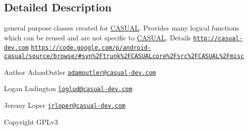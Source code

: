 \subsection{Detailed Description}
general purpose classes created for \hyperlink{namespace_c_a_s_u_a_l}{C\-A\-S\-U\-A\-L}. Provides many logical functions which can be reused and are not specific to \hyperlink{namespace_c_a_s_u_a_l}{C\-A\-S\-U\-A\-L}. Details \href{http://casual-dev.com}{\tt http\-://casual-\/dev.\-com} \href{https://code.google.com/p/android-casual/source/browse/#svn%2Ftrunk%2FCASUALcore%2Fsrc%2FCASUAL%2Fmisc}{\tt https\-://code.\-google.\-com/p/android-\/casual/source/browse/\#svn\%2\-Ftrunk\%2\-F\-C\-A\-S\-U\-A\-Lcore\%2\-Fsrc\%2\-F\-C\-A\-S\-U\-A\-L\%2\-Fmisc} \begin{DoxyAuthor}{Author}
Adam\-Outler \href{mailto:adamoutler@casual-dev.com}{\tt adamoutler@casual-\/dev.\-com} 

Logan Ludington \href{mailto:loglud@casual-dev.com}{\tt loglud@casual-\/dev.\-com} 

Jeremy Loper \href{mailto:jrloper@casual-dev.com}{\tt jrloper@casual-\/dev.\-com} 
\end{DoxyAuthor}
\begin{DoxyCopyright}{Copyright}
G\-P\-Lv3 
\end{DoxyCopyright}
